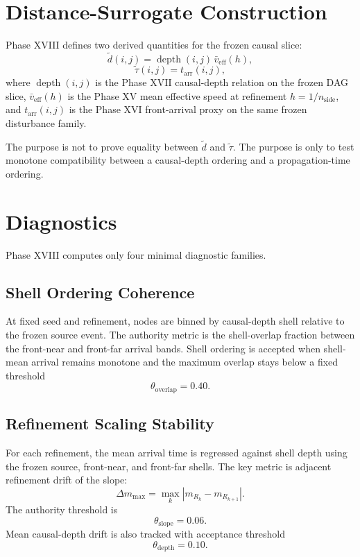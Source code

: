 \documentclass[11pt]{article}
\begin{document}
\section{Distance-Surrogate Construction}

Phase XVIII defines two derived quantities for the frozen causal slice:
\[
\tilde d(i,j)=\operatorname{depth}(i,j)\,\bar v_{\mathrm{eff}}(h),
\]
\[
\tilde \tau(i,j)=t_{\mathrm{arr}}(i,j),
\]
where $\operatorname{depth}(i,j)$ is the Phase XVII causal-depth relation on the frozen DAG slice, $\bar v_{\mathrm{eff}}(h)$ is the Phase XV mean effective speed at refinement $h=1/n_{\mathrm{side}}$, and $t_{\mathrm{arr}}(i,j)$ is the Phase XVI front-arrival proxy on the same frozen disturbance family.

The purpose is not to prove equality between $\tilde d$ and $\tilde \tau$. The purpose is only to test monotone compatibility between a causal-depth ordering and a propagation-time ordering.

\section{Diagnostics}

Phase XVIII computes only four minimal diagnostic families.

\subsection{Shell Ordering Coherence}

At fixed seed and refinement, nodes are binned by causal-depth shell relative to the frozen source event. The authority metric is the shell-overlap fraction between the front-near and front-far arrival bands. Shell ordering is accepted when shell-mean arrival remains monotone and the maximum overlap stays below a fixed threshold
\[
\theta_{\mathrm{overlap}}=0.40.
\]

\subsection{Refinement Scaling Stability}

For each refinement, the mean arrival time is regressed against shell depth using the frozen source, front-near, and front-far shells. The key metric is adjacent refinement drift of the slope:
\[
\Delta m_{\max}=\max_k |m_{R_k}-m_{R_{k+1}}|.
\]
The authority threshold is
\[
\theta_{\mathrm{slope}}=0.06.
\]
Mean causal-depth drift is also tracked with acceptance threshold
\[
\theta_{\mathrm{depth}}=0.10.
\]
\end{document}
